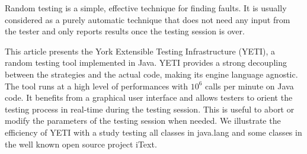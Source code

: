 Random testing is a simple, effective technique for finding faults. It is usually considered as a purely automatic technique that does not need any input from the tester and only reports results once the testing session is over.

This article presents the York Extensible Testing Infrastructure (YETI), a random testing tool implemented in Java. YETI provides a strong decoupling between the strategies and the actual code, making its engine language agnostic. The tool runs at a high level of performances with $10^6$ calls per minute on Java code. It benefits from a graphical user interface and allows testers to orient the testing process in real-time during the testing session. This is useful to abort or modify the parameters of the testing session when needed. We illustrate the efficiency of YETI  with a study testing all classes in java.lang and some classes in the well known open source project iText.
 